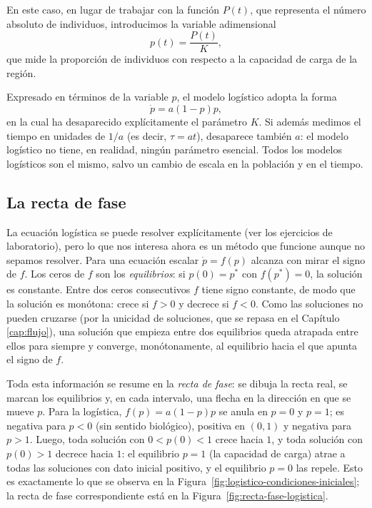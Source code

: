 \documentclass[12pt, a4paper]{amsbook}
\theoremstyle{remark}
\theoremstyle{definition}
\numberwithin{section}{chapter}
\numberwithin{subsection}{section}
\numberwithin{equation}{section}
\numberwithin{figure}{chapter}
\begin{document}
En este caso, en lugar de trabajar con la función $P(t)$, que representa el número absoluto de individuos, introducimos la variable adimensional
$$
p(t) = \frac{P(t)}{K},
$$
que mide la proporción de individuos con respecto a la capacidad de carga de la región.

Expresado en términos de la variable $p$, el modelo logístico adopta la forma
$$
\dot p = a(1 - p)p,
$$
en la cual ha desaparecido explícitamente el parámetro $K$. Si además medimos el tiempo en unidades de $1/a$ (es decir, $\tau = at$), desaparece también $a$: el modelo logístico no tiene, en realidad, ningún parámetro esencial. Todos los modelos logísticos son el mismo, salvo un cambio de escala en la población y en el tiempo.

\subsection*{La recta de fase}

La ecuación logística se puede resolver explícitamente (ver los ejercicios de laboratorio), pero lo que nos interesa ahora es un método que funcione aunque no sepamos resolver. Para una ecuación escalar $\dot p = f(p)$ alcanza con mirar el signo de $f$. Los ceros de $f$ son los \emph{equilibrios}: si $p(0)=p^*$ con $f(p^*)=0$, la solución es constante. Entre dos ceros consecutivos $f$ tiene signo constante, de modo que la solución es monótona: crece si $f>0$ y decrece si $f<0$. Como las soluciones no pueden cruzarse (por la unicidad de soluciones, que se repasa en el Capítulo \ref{cap:flujo}), una solución que empieza entre dos equilibrios queda atrapada entre ellos para siempre y converge, monótonamente, al equilibrio hacia el que apunta el signo de $f$.

Toda esta información se resume en la \emph{recta de fase}: se dibuja la recta real, se marcan los equilibrios y, en cada intervalo, una flecha en la dirección en que se mueve $p$. Para la logística, $f(p) = a(1-p)p$ se anula en $p=0$ y $p=1$; es negativa para $p<0$ (sin sentido biológico), positiva en $(0,1)$ y negativa para $p>1$. Luego, toda solución con $0<p(0)<1$ crece hacia $1$, y toda solución con $p(0)>1$ decrece hacia $1$: el equilibrio $p=1$ (la capacidad de carga) atrae a todas las soluciones con dato inicial positivo, y el equilibrio $p=0$ las repele. Esto es exactamente lo que se observa en la Figura~\ref{fig:logistico-condiciones-iniciales}; la recta de fase correspondiente está en la Figura~\ref{fig:recta-fase-logistica}.
\end{document}
